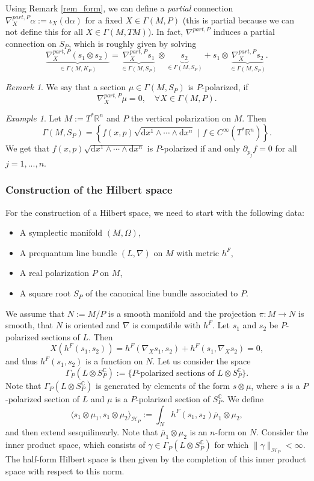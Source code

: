 \documentclass[12pt]{amsart}
\numberwithin{equation}{section}
\theoremstyle{plain}
\theoremstyle{definition}
\theoremstyle{remark}
\newtheorem{rem}{Remark}[subsection]
\newtheorem{ex}{Example}[subsection]
\newcommand{\R}{\mathbb{R}}
\newcommand{\dd}{{\mathrm{d}}}
\newcommand{\calH}{\mathcal{H}}
\begin{document}
Using Remark \ref{rem_form}, we can define a \emph{partial} connection $\nabla_X^{part,P}\alpha:=\iota_X(\dd\alpha)$ for a fixed $X\in\Gamma(M,P)$ (this is partial because we can not define this for all $X\in\Gamma(M,TM)$). In fact, $\nabla^{part,P}$ induces a partial connection on $S_P$, which is roughly given by solving 
$$\underbrace{\nabla_X^{part,P}(s_1\otimes s_2)}_{\in\Gamma(M,K_P)}=\underbrace{\nabla_X^{part,P}s_1}_{\in\Gamma(M,S_P)}\otimes \underbrace{s_2}_{\in\Gamma(M,S_P)}+s_1\otimes\underbrace{\nabla_X^{part,P} s_2}_{\in\Gamma(M,S_P)}.$$

\begin{rem}
We say that a section $\mu\in\Gamma(M,S_P)$ is $P$-polarized, if 
\[
\nabla_X^{part,P}\mu=0,\quad \forall X\in \Gamma(M,P).
\]
\end{rem}


\begin{ex}
Let $M:=T^*\R^n$ and $P$ the vertical polarization on $M$. Then $$\Gamma(M,S_P)=\left\{f(x,p)\sqrt{\dd x^1\land\dotsm\land \dd x^n}\,\,\big|\,\, f\in C^\infty(T^*\R^n)\right\}.$$ We get that $f(x,p)\sqrt{\dd x^1\land\dotsm \land\dd x^n}$ is $P$-polarized if and only $\partial_{p_j}f=0$ for all $j=1,...,n$.
\end{ex}


\subsubsection{Construction of the Hilbert space}
For the construction of a Hilbert space, we need to start with the following data:
\begin{itemize}
\item{A symplectic manifold $(M,\Omega)$,}
\item{A prequantum line bundle $(L,\nabla)$ on $M$ with metric $h^F$,}
\item{A real polarization $P$ on $M$,}
\item{A square root $S_P$ of the canonical line bundle associated to $P$.}
\end{itemize}
We assume that $N:=M/P$ is a smooth manifold and the projection $\pi\colon M\to N$ is smooth, that $N$ is oriented and $\nabla$ is compatible with $h^F$. Let $s_1$ and $s_2$ be $P$-polarized sections of $L$. Then 
$$X\left(h^F(s_1,s_2)\right)=h^F(\nabla_Xs_1,s_2)+h^F(s_1,\nabla_Xs_2)=0,$$
and thus $h^F(s_1,s_2)$ is a function on $N$. Let us consider the space 
$$\Gamma_P(L\otimes S_P^\mathbb{C}):=\{\text{$P$-polarized sections of $L\otimes S_P^\mathbb{C}$}\}.$$
Note that $\Gamma_P(L\otimes S_P^\mathbb{C})$ is generated by elements of the form $s\otimes\mu$, where $s$ is a $P$-polarized section of $L$ and $\mu$ is a $P$-polarized section of $S_P^\mathbb{C}$. We define 
\[
\langle s_1\otimes\mu_1,s_1\otimes \mu_2\rangle_{\calH_P}:=\int_Nh^F(s_1,s_2)\bar\mu_1\otimes\mu_2,
\]
and then extend sesquilinearly. Note that $\bar\mu_1\otimes\mu_2$ is an $n$-form on $N$. Consider the inner product space, which consists of $\gamma\in\Gamma_P(L\otimes S_P^\mathbb{C})$ for which $\|\gamma\|_{\calH_P}<\infty$. The half-form Hilbert space is then given by the completion of this inner product space with respect to this norm.
\end{document}
